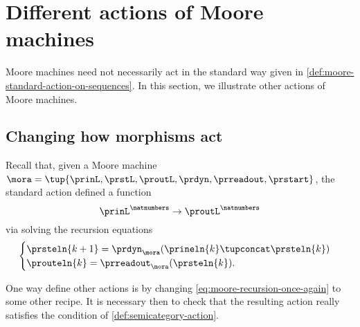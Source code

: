 
\section{Different actions of Moore machines}
\label{sec:different-actions-of-moore-machines}

Moore machines need not necessarily act in the standard way given in \cref{def:moore-standard-action-on-sequences}.
In this section, we illustrate other actions of Moore machines.

\subsection{Changing how morphisms act}

Recall that, given a Moore machine~$\mora = \tup{\prinL,\prstL,\proutL,\prdyn,\prreadout,\prstart}$, the standard action defined a function
\begin{equation*}
    {\prinL}^\natnumbers \to {\proutL}^\natnumbers
\end{equation*}
via solving the recursion equations
\begin{equation}
    \label{eq:moore-recursion-once-again}
    \begin{cases}
        \prsteln{k+1} = \prdyn_\mora(\prineln{k} \tupconcat \prsteln{k}) \\
        \prouteln{k}   = \prreadout_\mora(\prsteln{k}).
    \end{cases}
\end{equation}

One way define other actions is by changing \cref{eq:moore-recursion-once-again} to some other recipe.
It is necessary then to check that the resulting action really satisfies the condition of \cref{def:semicategory-action}.

